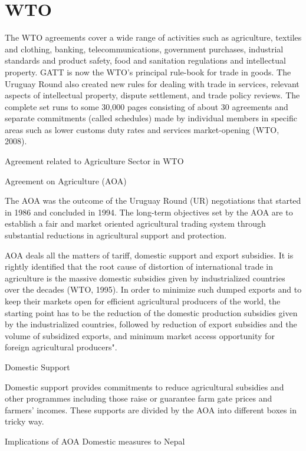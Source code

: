 \documentclass[
]{book}
\begin{document}
\hypertarget{wto}{%
\section{WTO}\label{wto}}

The WTO agreements cover a wide range of activities such as agriculture, textiles and clothing, banking, telecommunications, government purchases, industrial standards and product safety, food and sanitation regulations and intellectual property. GATT is now the WTO's principal rule-book for trade in goods. The Uruguay Round also created new rules for dealing with trade in services, relevant aspects of intellectual property, dispute settlement, and trade policy reviews. The complete set runs to some 30,000 pages consisting of about 30 agreements and separate commitments (called schedules) made by individual members in specific areas such as lower customs duty rates and services market-opening (WTO, 2008).

Agreement related to Agriculture Sector in WTO

Agreement on Agriculture (AOA)

The AOA was the outcome of the Uruguay Round (UR) negotiations that started in 1986 and concluded in 1994. The long-term objectives set by the AOA are to establish a fair and market oriented agricultural trading system through substantial reductions in agricultural support and protection.

AOA deals all the matters of tariff, domestic support and export subsidies. It is rightly identified that the root cause of distortion of international trade in agriculture is the massive domestic subsidies given by industrialized countries over the decades (WTO, 1995). In order to minimize such dumped exports and to keep their markets open for efficient agricultural producers of the world, the starting point has to be the reduction of the domestic production subsidies given by the industrialized countries, followed by reduction of export subsidies and the volume of subsidized exports, and minimum market access opportunity for foreign agricultural producers".

Domestic Support

Domestic support provides commitments to reduce agricultural subsidies and other programmes including those raise or guarantee farm gate prices and farmers' incomes. These supports are divided by the AOA into different boxes in tricky way.

Implications of AOA Domestic measures to Nepal
\end{document}
